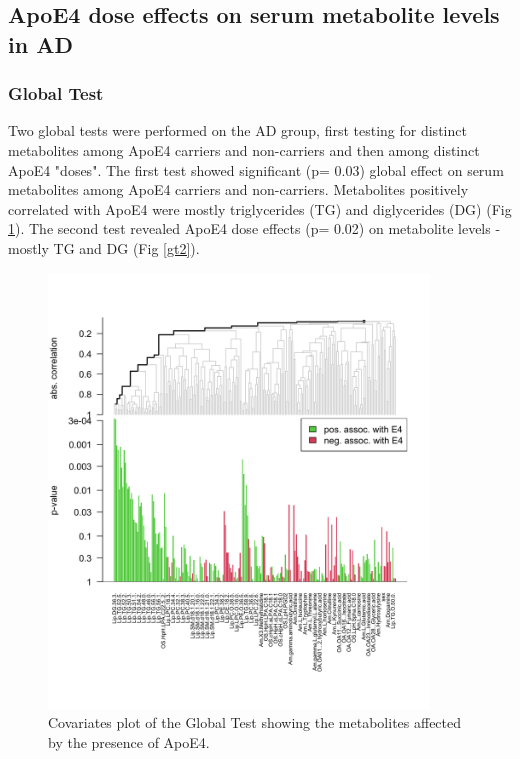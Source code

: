 \documentclass{amsart}
\begin{document}
\subsection{ApoE4 dose effects on serum metabolite levels in AD}
\subsubsection{Global Test}
Two global tests were performed on the AD group, first testing for distinct metabolites among ApoE4 carriers and non-carriers and then among distinct ApoE4 "doses". The first test showed significant (p= 0.03) global effect on serum metabolites among ApoE4 carriers and non-carriers. Metabolites positively correlated with ApoE4 were mostly triglycerides (TG) and diglycerides (DG) (Fig \ref{gt1}). The second test revealed ApoE4 dose effects (p= 0.02) on metabolite levels  -mostly TG and DG (Fig \ref{gt2}).
\begin{figure}[htb]
    \includegraphics[width=0.9\textwidth]{figures/gt1.png}
      \caption{Covariates plot of the Global Test showing the metabolites affected by the presence of ApoE4.}
    \label{gt1}
  \end{figure}
\end{document}
